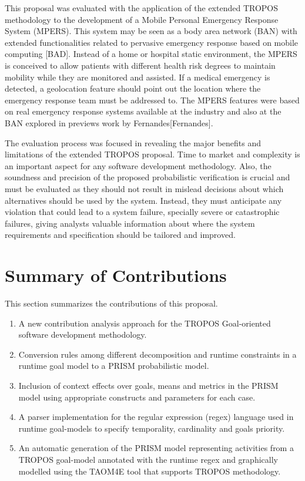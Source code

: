 This proposal was evaluated with the application of the extended TROPOS methodology to the development of a Mobile Personal Emergency Response System (MPERS). This system may be seen as a body area network (BAN) with extended functionalities related to pervasive emergency response based on mobile computing [BAD]. Instead of a home or hospital static environment, the MPERS is conceived to allow patients with different health risk degrees to maintain mobility while they are monitored and assisted. If a medical emergency is detected, a geolocation feature should point out the location where the emergency response team must be addressed to. The MPERS features were based on real emergency response systems available at the industry and also at the BAN explored in previews work by Fernandes[Fernandes].

The evaluation process was focused in revealing the major benefits and limitations of the extended TROPOS proposal. Time to market and complexity is an important aspect for any software development methodology. Also, the soundness and precision of the proposed probabilistic verification is crucial and must be evaluated as they should not result in mislead decisions about which alternatives should be used by the system. Instead, they must anticipate any violation that could lead to a system failure, specially severe or catastrophic failures, giving analysts valuable information about where the system requirements and specification should be tailored and improved.

\section{Summary of Contributions}

This section summarizes the contributions of this proposal.


\begin{enumerate}

\item A new contribution analysis approach for the TROPOS Goal-oriented software development methodology.

\item Conversion rules among different decomposition and runtime constraints in a runtime goal model to a PRISM probabilistic model.

\item Inclusion of context effects over goals, means and metrics in the PRISM model using appropriate constructs and parameters for each case.

\item A parser implementation for the regular expression (regex) language used in runtime goal-models to specify temporality, cardinality and goals priority. 

\item An automatic generation of the PRISM model representing activities from a TROPOS goal-model annotated with the runtime regex and graphically modelled using the TAOM4E tool that supports TROPOS methodology.

\end{enumerate}

